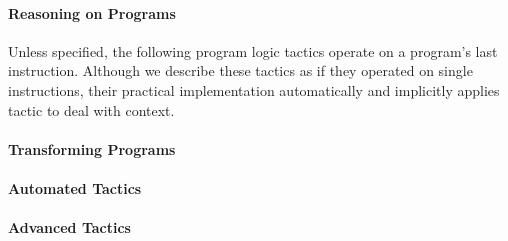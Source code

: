 \paragraph{Reasoning on Programs}
Unless specified, the following program logic tactics operate on a
program's last instruction. Although we describe these tactics as if
they operated on single instructions, their practical implementation
automatically and implicitly applies tactic  to deal with
context.

\medskip












\paragraph{Transforming Programs}
















\paragraph{Automated Tactics}



\paragraph{Advanced Tactics}


